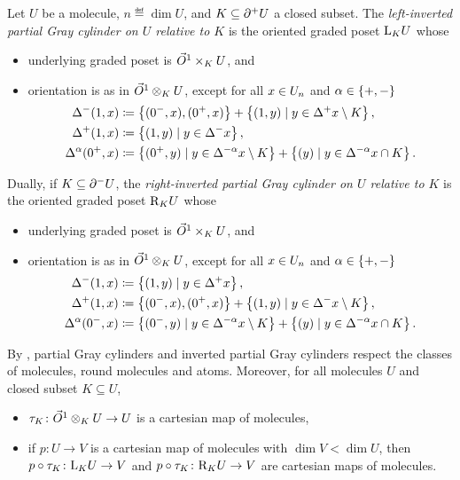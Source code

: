\begin{dfn}
	Let \( U \) be a molecule, \( n \eqdef \dim U \), and \( K \subseteq \bd{}{+}U \) a closed subset.
	The \emph{left-inverted partial Gray cylinder on \( U \) relative to \( K \)} is the oriented graded poset \( \lcyl{K} U \) whose
    \begin{itemize}
        \item underlying graded poset is \( \arr \times_K U \), and
        \item orientation is as in \( \arr \gray_K U \), except for all \( x \in \gr{n}{U} \) and \( \a \in \set{+, -} \)
    \begin{align*}
        \faces{}{-}(1, x) &\eqdef \set{(0^-, x), (0^+, x)} + \set{(1, y) \mid y \in \faces{}{+}x \setminus K}, \\
        \faces{}{+}(1, x) &\eqdef \set{(1, y) \mid y \in \faces{}{-}x}, \\
        \faces{}{\a}(0^+, x) &\eqdef \set{(0^+, y) \mid y \in \faces{}{-\a}x \setminus K} + 
            \set{(y) \mid y \in \faces{}{-\a}x \cap K}.
    \end{align*}
\end{itemize}
	Dually, if \( K \subseteq \bd{}{-}U \), the \emph{right-inverted partial Gray cylinder on \( U \) relative to \( K \)} is the oriented graded poset \( \rcyl{K}{U} \) whose
    \begin{itemize}
        \item underlying graded poset is \( \arr \times_K U \), and
        \item orientation is as in \( \arr \gray_K U \), except for all \( x \in \gr{n}{U} \) and \( \a \in \set{+, -} \)
        \begin{align*}
            \faces{}{-}(1, x) &\eqdef \set{(1, y) \mid y \in \faces{}{+}x}, \\
            \faces{}{+}(1, x) &\eqdef \set{(0^-, x), (0^+, x)} + \set{(1, y) \mid y \in \faces{}{-}x \setminus K}, \\
            \faces{}{\a}(0^-, x) &\eqdef \set{(0^-, y) \mid y \in \faces{}{-\a}x \setminus K} + 
                \set{(y) \mid y \in \faces{}{-\a}x \cap K}.
        \end{align*}
    \end{itemize}
\end{dfn}

\begin{rmk} \label{rmk:inverted_cylinder_well_def}
	By \cite[Lemma 1.20, Lemma 1.26]{chanavat2024equivalences}, partial Gray cylinders and inverted partial Gray cylinders respect the classes of molecules, round molecules and atoms.
	Moreover, for all molecules \( U \) and closed subset \( K \subseteq U \),
	\begin{itemize}
		\item \( \tau_K \colon \arr \gray_K U \to U \) is a cartesian map of molecules,
		\item if \( p \colon U \to V \) is a cartesian map of molecules with \( \dim V < \dim U \), then \( p \after \tau_K \colon \lcyl{K}{U} \to V \) and \( p \after \tau_K \colon \rcyl{K}{U} \to V \) are cartesian maps of molecules.
	\end{itemize}
\end{rmk}

